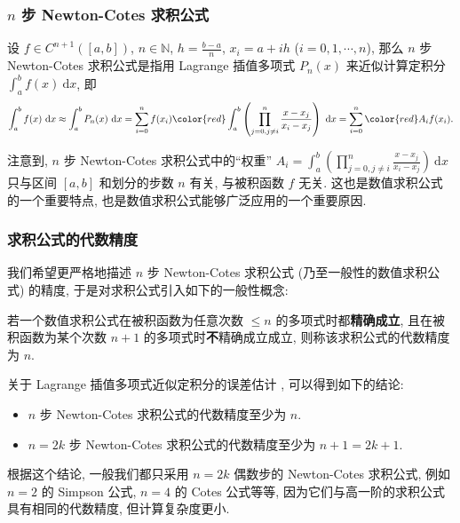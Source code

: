 \begin{frame}
\frametitle{$n$ 步 Newton-Cotes 求积公式}

\begin{Def}
设 $f \in C^{n+1}([a, b])$, $n \in \mathbb{N}$, $h = \frac{b - a}{n}$, $x_i = a + i h$ ($i = 0, 1, \cdots, n$), 那么 $n$ 步 Newton-Cotes 求积公式是指用 Lagrange 插值多项式 $P_n(x)$ 来近似计算定积分 $\int_a^b f(x) ~ \mathrm{d}x$, 即
\[
\int_a^b f(x) ~ \mathrm{d}x \approx \int_a^b P_n(x) ~ \mathrm{d}x = \sum_{i=0}^n f(x_i) {\color{red}\int_a^b \left( \prod_{j=0, j \neq i}^n \frac{x - x_j}{x_i - x_j} \right) ~ \mathrm{d}x} = \sum_{i=0}^n {\color{red}A_i} f(x_i).
\]
\end{Def}

\pause
\vspace{0.5em}

注意到, $n$ 步 Newton-Cotes 求积公式中的``权重'' $A_i = \int_a^b \left( \prod_{j=0, j \neq i}^n \frac{x - x_j}{x_i - x_j} \right) ~ \mathrm{d}x$ 只与区间 $[a, b]$ 和划分的步数 $n$ 有关, 与被积函数 $f$ 无关. 这也是数值求积公式的一个重要特点, 也是数值求积公式能够广泛应用的一个重要原因.

\end{frame}


\begin{frame}
\frametitle{求积公式的代数精度}

我们希望更严格地描述 $n$ 步 Newton-Cotes 求积公式 (乃至一般性的数值求积公式) 的精度, 于是对求积公式引入如下的一般性概念:

\begin{Def}[求积公式的代数精度]
若一个数值求积公式在被积函数为任意次数 $\leqslant n$ 的多项式时都\textbf{精确成立}, 且在被积函数为某个次数 $n+1$ 的多项式时\textbf{不}精确成立成立, 则称该求积公式的代数精度为 $n$.
\end{Def}

\pause
\vspace{0.5em}

关于 Lagrange 插值多项式近似定积分的误差估计
, 可以得到如下的结论:

\begin{cor}
\begin{itemize}
\item $n$ 步 Newton-Cotes 求积公式的代数精度至少为 $n$.
\item $n = 2k$ 步 Newton-Cotes 求积公式的代数精度至少为 $n + 1 = 2k + 1$.
\end{itemize}
\end{cor}

根据这个结论, 一般我们都只采用 $n = 2k$ 偶数步的 Newton-Cotes 求积公式, 例如 $n = 2$ 的 Simpson 公式, $n = 4$ 的 Cotes 公式等等, 因为它们与高一阶的求积公式具有相同的代数精度, 但计算复杂度更小.

\end{frame}

